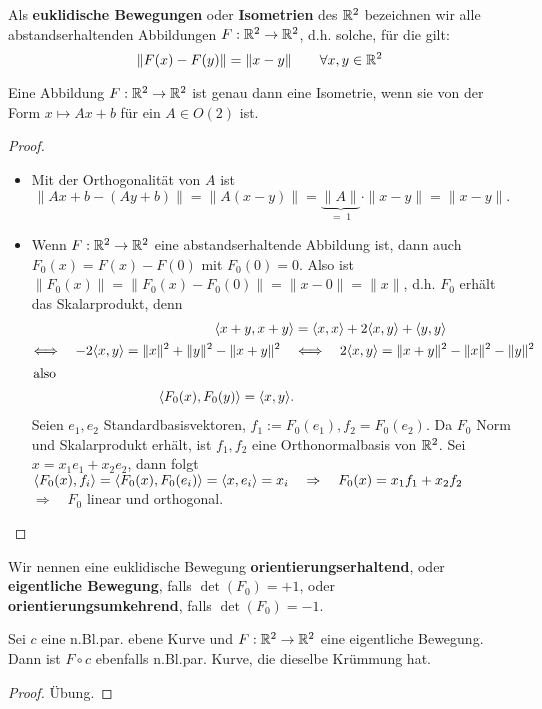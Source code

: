 \documentclass[11pt]{scrbook}
\begin{document}
\begin{df}
Als \textbf{euklidische Bewegungen} oder \textbf{Isometrien} des $\mathbb{R}^2$ bezeichnen wir alle abstandserhaltenden Abbildungen $F: \mathbb{R}^2 \to \mathbb{R}^2$, d.h. solche, für die gilt:
\[ \| F(x) - F(y) \| = \| x - y \| \qquad \forall x,y \in \mathbb{R}^2 \]
\end{df}

\begin{st}
Eine Abbildung $F: \mathbb{R}^2 \to \mathbb{R}^2$ ist genau dann eine Isometrie, wenn sie von der Form $x \mapsto Ax + b$ für ein $A \in O(2)$ ist.
\begin{proof}
\begin{itemize}
	\item Mit der Orthogonalität von $A$ ist \[ \| Ax+b - (Ay + b) \| = \| A(x-y) \| = \underbrace{\| A \|}_{ = \; 1} \cdot \| x - y \| = \| x - y \| .  \]
	\item
	Wenn $F:\mathbb{R}^2 \to \mathbb{R}^2$ eine abstandserhaltende Abbildung ist, dann auch $F_0(x) = F(x) - F(0)$ mit $F_0(0) = 0$. Also ist $\| F_0(x) \| = \| F_0(x) - F_0(0) \| = \| x - 0 \| = \| x\|$, d.h. $F_0$ erhält das Skalarprodukt, denn
	\begin{align*} \langle x+y , x+y \rangle &= \langle x,x \rangle + 2 \langle x,y \rangle + \langle y,y \rangle   \\
	\Longleftrightarrow \quad -2 \langle x,y \rangle = \| x\|^2 + \| y\|^2 - \| x+y \|^2  \quad  &\Longleftrightarrow \quad 2 \langle x,y \rangle =  \| x+y \|^2 - \| x\|^2 - \| y\|^2 \\
\intertext{also } \qquad \langle F_0(x), F_0(y) \rangle = \langle x,y \rangle.
	\end{align*}
	Seien $e_1, e_2$ Standardbasisvektoren, $f_1 := F_0(e_1), f_2 = F_0(e_2)$. Da $F_0$ Norm und Skalarprodukt erhält, ist $f_1, f_2$ eine Orthonormalbasis von $\mathbb{R}^2$. Sei $x = x_1 e_1 + x_2 e_2$, dann folgt $ \langle F_0(x), f_i \rangle = \langle F_0(x), F_0(e_i) \rangle = \langle x, e_i \rangle = x_i \quad \Rightarrow \quad F_0(x) = x_1 f_1 + x_2 f_2$ \\ $ \Longrightarrow \quad F_0$ linear und orthogonal.
\end{itemize}
\end{proof}
\end{st}

\begin{df*}
Wir nennen eine euklidische Bewegung \textbf{orientierungserhaltend}, oder \textbf{eigentliche Bewegung}, falls $ \det(F_0) = + 1 $, oder \textbf{orientierungsumkehrend}, falls $ \det(F_0) = - 1 $.
\end{df*}

\begin{st}
\label{3.5}
Sei $c$ eine n.Bl.par. ebene Kurve und $F: \mathbb{R}^2 \to \mathbb{R}^2$ eine eigentliche Bewegung. Dann ist $F \circ c$ ebenfalls n.Bl.par. Kurve, die dieselbe Krümmung hat.
\begin{proof}
Übung.
\end{proof}
\end{st}
\end{document}
